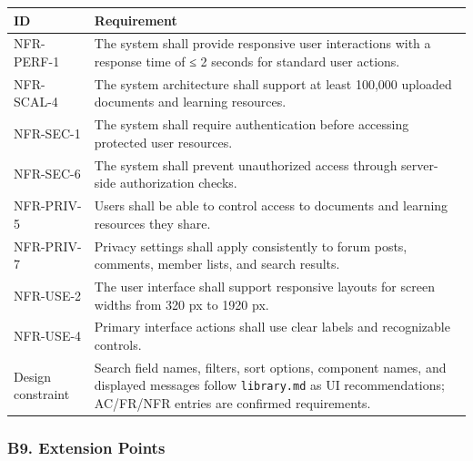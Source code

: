 \documentclass[12pt]{article}
\renewcommand{\baselinestretch}{1.5}
\begin{document}
\begingroup
\small
\renewcommand{\baselinestretch}{1.0}\selectfont
\renewcommand{\arraystretch}{1.15}
\setlength{\tabcolsep}{6pt}
\begin{longtable}{|>{\raggedright\arraybackslash}p{}|>{\raggedright\arraybackslash}p{}|}
\hline
\textbf{ID} & \textbf{Requirement} \\ \hline
\endhead
NFR-PERF-1 & The system shall provide responsive user interactions with a response time of ≤ 2 seconds for standard user actions. \\ \hline
NFR-SCAL-4 & The system architecture shall support at least 100,000 uploaded documents and learning resources. \\ \hline
NFR-SEC-1 & The system shall require authentication before accessing protected user resources. \\ \hline
NFR-SEC-6 & The system shall prevent unauthorized access through server-side authorization checks. \\ \hline
NFR-PRIV-5 & Users shall be able to control access to documents and learning resources they share. \\ \hline
NFR-PRIV-7 & Privacy settings shall apply consistently to forum posts, comments, member lists, and search results. \\ \hline
NFR-USE-2 & The user interface shall support responsive layouts for screen widths from 320 px to 1920 px. \\ \hline
NFR-USE-4 & Primary interface actions shall use clear labels and recognizable controls. \\ \hline
Design constraint & Search field names, filters, sort options, component names, and displayed messages follow \texttt{library.md} as UI recommendations; AC/FR/NFR entries are confirmed requirements. \\ \hline
\end{longtable}
\endgroup
\par\medskip

\hypertarget{sec:b9-extension-points}{}
\subsubsection*{B9. Extension Points}
\par\medskip
\end{document}
